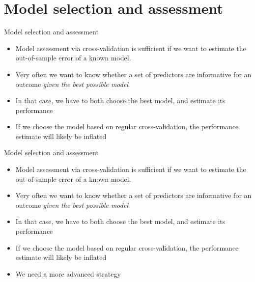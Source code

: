\documentclass[10pt]{beamer}
\begin{document}
    \section{Model selection and assessment}

    \begin{frame}[t]{Model selection and assessment}
        \vspace{1cm}
        \begin{itemize}
            \item Model assessment via cross-validation is sufficient if we want to estimate the out-of-sample error of a known model.
            \item Very often we want to know whether a set of predictors are informative for an outcome \textit{given the best possible model}
            \item In that case, we have to both choose the best model, and estimate its performance
            \item If we choose the model based on regular cross-validation, the performance estimate will likely be inflated
         \end{itemize}
    \end{frame}

    \begin{frame}[t]{Model selection and assessment}
        \vspace{1cm}
        \begin{itemize}
            \item Model assessment via cross-validation is sufficient if we want to estimate the out-of-sample error of a known model.
            \item Very often we want to know whether a set of predictors are informative for an outcome \textit{given the best possible model}
            \item In that case, we have to both choose the best model, and estimate its performance
            \item If we choose the model based on regular cross-validation, the performance estimate will likely be inflated
            \item[\rightarrow] We need a more advanced strategy
         \end{itemize}
    \end{frame}
\end{document}
